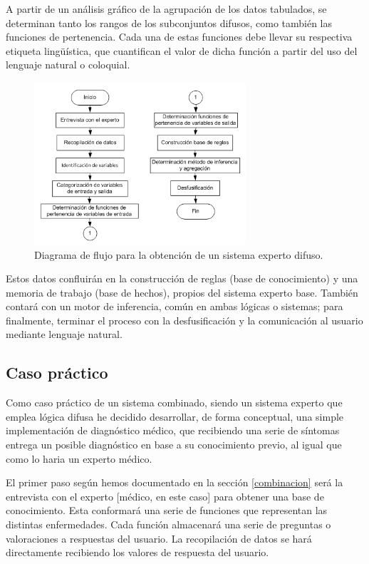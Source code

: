 \documentclass[a4paper, 11pt, titlepage]{article}
\begin{document}
    A partir de un análisis gráfico de la agrupación de los datos tabulados, se determinan tanto los 
    rangos de los subconjuntos difusos, como también las funciones de pertenencia. Cada una de 
    estas funciones debe llevar su respectiva etiqueta lingüística, que cuantifican el valor de dicha 
    función a partir del uso del lenguaje natural o coloquial. 

    \begin{figure}[htp]
        \centering
        \includegraphics[width=0.7\textwidth]{resources/diagramaflujoexperto.png}
        \caption{Diagrama de flujo para la obtención de un sistema experto difuso.}
        \label{diagramaflujoexperto}
    \end{figure}

    Estos datos confluirán en la construcción de reglas (base de conocimiento) y una memoria de trabajo 
    (base de hechos), propios del sistema experto base. También contará con un motor de inferencia, común 
    en ambas lógicas o sistemas; para finalmente, terminar el proceso con la desfusificación y la comunicación 
    al usuario mediante lenguaje natural.
    
    \subsection{Caso práctico}\label{casopractico}

        Como caso práctico de un sistema combinado, siendo un sistema experto que emplea lógica difusa he 
        decidido desarrollar, de forma conceptual, una simple implementación de diagnóstico médico, que 
        recibiendo una serie de síntomas entrega un posible diagnóstico en base a su conocimiento previo, al igual 
        que como lo haria un experto médico.

        El primer paso según hemos documentado en la sección \ref{combinacion} será la entrevista con el 
        experto [médico, en este caso] para obtener una base de conocimiento. Esta conformará una serie de 
        funciones que representan las distintas enfermedades. Cada función almacenará una serie de preguntas 
        o valoraciones a respuestas del usuario. La recopilación de datos se hará directamente recibiendo los 
        valores de respuesta del usuario.
\end{document}
